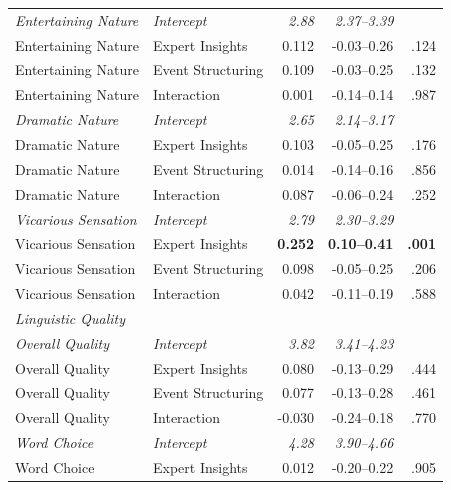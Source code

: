 \begin{table}[H]
\begin{tabular}{l l r r r}
  \addlinespace
  \textit{Entertaining Nature} & \textit{Intercept}    & \textit{2.88}  & \textit{2.37--3.39}   & \\
  Entertaining Nature   & Expert Insights   & 0.112          & -0.03--0.26           & .124 \\
  Entertaining Nature   & Event Structuring & 0.109          & -0.03--0.25           & .132 \\
  Entertaining Nature   & Interaction       & 0.001          & -0.14--0.14           & .987 \\
  \addlinespace
  \textit{Dramatic Nature}     & \textit{Intercept}    & \textit{2.65}  & \textit{2.14--3.17}   & \\
  Dramatic Nature       & Expert Insights   & 0.103          & -0.05--0.25           & .176 \\
  Dramatic Nature       & Event Structuring & 0.014          & -0.14--0.16           & .856 \\
  Dramatic Nature       & Interaction       & 0.087          & -0.06--0.24           & .252 \\
  \addlinespace
  \textit{Vicarious Sensation} & \textit{Intercept}    & \textit{2.79}  & \textit{2.30--3.29}   & \\
  Vicarious Sensation   & Expert Insights   & \textbf{0.252} & \textbf{0.10--0.41} & \textbf{.001} \\
  Vicarious Sensation   & Event Structuring & 0.098          & -0.05--0.25           & .206 \\
  Vicarious Sensation   & Interaction       & 0.042          & -0.11--0.19           & .588 \\
  \midrule
  \multicolumn{5}{l}{\textit{Linguistic Quality}} \\
  \midrule
  \textit{Overall Quality}     & \textit{Intercept}    & \textit{3.82}  & \textit{3.41--4.23}   & \\
  Overall Quality       & Expert Insights   & 0.080          & -0.13--0.29           & .444 \\
  Overall Quality       & Event Structuring & 0.077          & -0.13--0.28           & .461 \\
  Overall Quality       & Interaction       & -0.030         & -0.24--0.18           & .770 \\
  \addlinespace
  \textit{Word Choice}         & \textit{Intercept}    & \textit{4.28}  & \textit{3.90--4.66}   & \\
  Word Choice           & Expert Insights   & 0.012          & -0.20--0.22           & .905 \\

\end{tabular}
\end{table}
